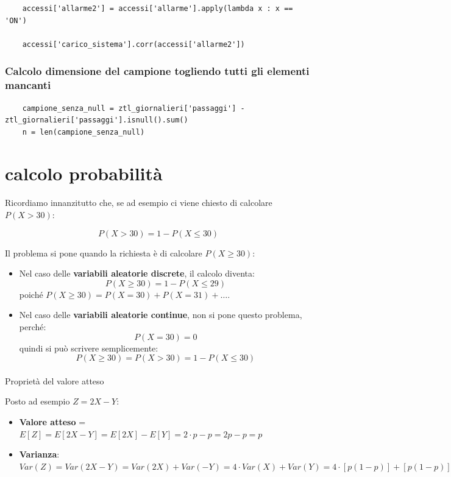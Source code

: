 \documentclass{article}
\begin{document}
\begin{lstlisting}
    accessi['allarme2'] = accessi['allarme'].apply(lambda x : x == 'ON')

    accessi['carico_sistema'].corr(accessi['allarme2'])
\end{lstlisting}

\subsubsection*{Calcolo dimensione del campione togliendo tutti gli elementi mancanti}

\begin{lstlisting}
    campione_senza_null = ztl_giornalieri['passaggi'] - ztl_giornalieri['passaggi'].isnull().sum()
    n = len(campione_senza_null)
\end{lstlisting}

\pagebreak

\section{calcolo probabilità}

Ricordiamo innanzitutto che, se ad esempio ci viene chiesto di calcolare $P(X > 30)$:

\[
P(X > 30) = 1 - P(X \leq 30)
\]

Il problema si pone quando la richiesta è di calcolare $P(X \geq 30)$:

\begin{itemize}
  \item Nel caso delle \textbf{variabili aleatorie discrete}, il calcolo diventa:
  \[
  P(X \geq 30) = 1 - P(X \leq 29)
  \]
  poiché $P(X \geq 30) = P(X = 30) + P(X = 31) + \dots$.

  \item Nel caso delle \textbf{variabili aleatorie continue}, non si pone questo problema, perché:
  \[
  P(X = 30) = 0
  \]
  quindi si può scrivere semplicemente:
  \[
  P(X \geq 30) = P(X > 30) = 1 - P(X \leq 30)
  \]
\end{itemize}

\paragraph{}{Proprietà del valore atteso}

Posto ad esempio $Z = 2X - Y$:

\begin{itemize}
    \item \textbf{Valore atteso} = $E[Z] = E[2X - Y] = E[2X] - E[Y] = 2 \cdot p - p = 2p - p = p$
    \item \textbf{Varianza}:  $Var(Z) = Var(2X - Y) = Var(2X) + Var(-Y) = 4 \cdot Var(X) + Var(Y) = 4 \cdot [p(1-p)] + [p(1-p)] = 4 \cdot (p - p^2) + [p - p^2] = 4p - 4p^2 + p - p^2 = -5p^2 + 5p = 5p(1 - p)$
\end{itemize}
\end{document}
